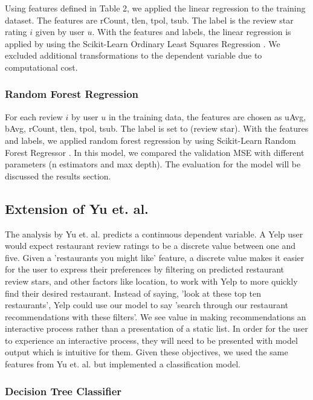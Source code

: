 \documentclass[12pt]{article}
\begin{document}
Using features defined in Table 2, we applied the linear regression to the training dataset. The
features are rCount, tlen, tpol, tsub. The label is the review star rating $i$ given by
user $u$. With the features and labels, the linear regression is applied by using
the Scikit-Learn Ordinary Least Squares Regression \cite{sklearnl76:online}. We excluded
additional transformations to the dependent variable due to computational cost.

\subsubsection{Random Forest Regression}

For each review $i$ by user $u$ in the training data, the features are chosen as uAvg, bAvg,
rCount, tlen, tpol, tsub. The label is set to (review star). With the features and labels,
we applied random forest regression by using Scikit-Learn Random Forest Regressor
\cite{32432skl20:online}. In this model, we compared the validation MSE with different
parameters (n estimators and max depth). The evaluation for the model will be discussed the
results section.

\subsection{Extension of Yu et. al.}

The analysis by Yu et. al. \cite{yu2015restaurants} predicts a continuous dependent variable.
A Yelp user would expect restaurant review ratings to be a discrete value between
one and five. Given a 'restaurants you might like' feature, a discrete value makes it easier
for the user to express their preferences by filtering on predicted restaurant review stars,
and other factors like location, to work with Yelp to more quickly find their desired restaurant.
Instead of saying, 'look at these top ten restaurants', Yelp could use our model to say
'search through our restaurant recommendations with these filters'. We see value in making
recommendations an interactive process rather than a presentation of a static list. In order
for the user to experience an interactive process, they will need to be presented with
model output which is intuitive for them. Given these objectives, we used the same features
from Yu et. al. \cite{yu2015restaurants} but implemented a classification model.

\subsubsection{Decision Tree Classifier}
\end{document}

